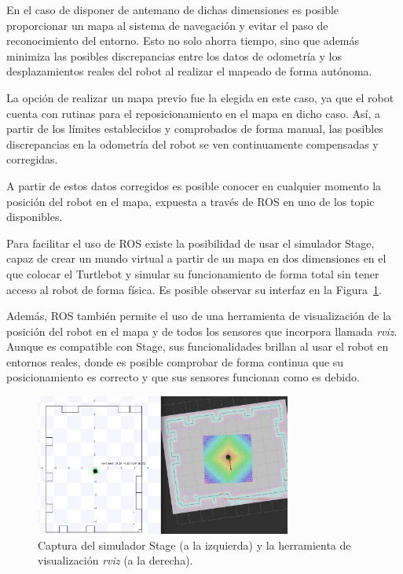En el caso de disponer de antemano de dichas dimensiones es posible proporcionar un mapa al sistema de navegación y evitar el paso de reconocimiento del entorno.
Esto no solo ahorra tiempo, sino que además minimiza las posibles discrepancias entre los datos de odometría y los desplazamientos reales del robot al realizar el mapeado de forma autónoma.

La opción de realizar un mapa previo fue la elegida en este caso, ya que el robot cuenta con rutinas para el reposicionamiento en el mapa en dicho caso.
Así, a partir de los límites establecidos y comprobados de forma manual, las posibles discrepancias en la odometría del robot se ven continuamente compensadas y corregidas.

A partir de estos datos corregidos es posible conocer en cualquier momento la posición del robot en el mapa, expuesta a través de ROS en uno de los topic disponibles.

Para facilitar el uso de ROS existe la posibilidad de usar el simulador Stage, capaz de crear un mundo virtual a partir de un mapa en dos dimensiones en el que colocar el Turtlebot y simular su funcionamiento de forma total sin tener acceso al robot de forma física.
Es posible observar su interfaz en la Figura~\ref{fig:stage_rviz}.

Además, ROS también permite el uso de una herramienta de visualización de la posición del robot en el mapa y de todos los sensores que incorpora llamada \textit{rviz}.
Aunque es compatible con Stage, sus funcionalidades brillan al usar el robot en entornos reales, donde es posible comprobar de forma continua que su posicionamiento es correcto y que sus sensores funcionan como es debido.

\begin{figure}[H]
    \centering
    \includegraphics[width=0.75\textwidth]{pic/Stage-rviz.png}
    \caption{Captura del simulador Stage (a la izquierda) y la herramienta de visualización \textit{rviz} (a la derecha).}
    \label{fig:stage_rviz}
\end{figure}

